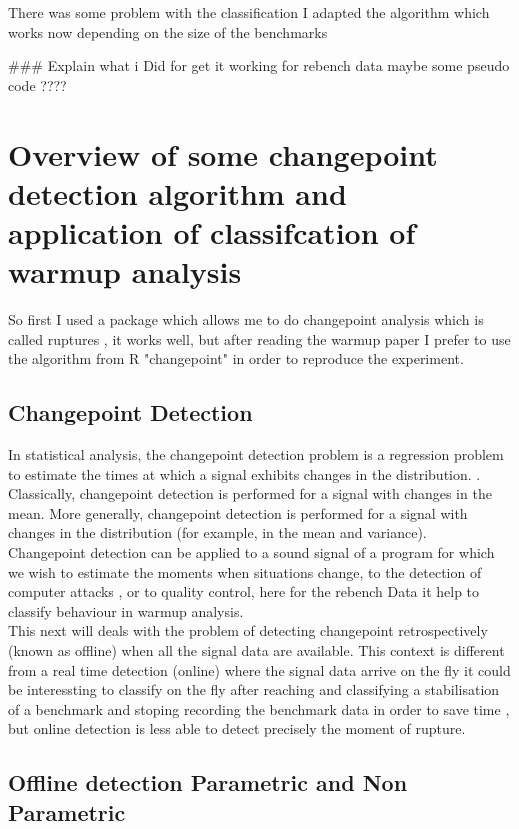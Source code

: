 \documentclass{article}
\begin{document}
There was some problem with the classification I adapted the algorithm which works now depending on the size of the benchmarks


\#\#\# Explain what i Did for get it working for rebench data maybe some pseudo code ????

\section{Overview of some changepoint detection algorithm and application of classifcation of warmup analysis}


So first I used a package which allows me to do changepoint analysis which is called ruptures \cite{truong2020selective}, it works well, but after reading the warmup paper I prefer to use the algorithm from R "changepoint" \cite{killick2014changepoint} in order to reproduce the experiment.



\subsection{Changepoint Detection}
In statistical analysis, the changepoint detection problem is a regression problem to estimate the times at which a signal exhibits changes in the distribution. . Classically, changepoint detection is performed for a signal with changes in the mean. More generally, changepoint detection is performed for a signal with changes in the distribution (for example, in the mean and variance). \\

Changepoint  detection can be applied to a sound signal of a program for which we wish to estimate the moments when situations change, to the detection of computer attacks  , or to quality control, here for the rebench Data it help to classify behaviour in warmup analysis. \\

This next will deals with the problem of detecting changepoint retrospectively (known as offline) when all the signal data are available. This context is different from a real time detection (online) where the signal data arrive on the fly it could be interessting to classify on the fly after reaching  and classifying a stabilisation of a benchmark and stoping recording the benchmark data in order to save time , but online detection is less able to detect precisely the moment of rupture.

\subsection{Offline detection Parametric and Non Parametric}
 
\end{document}
